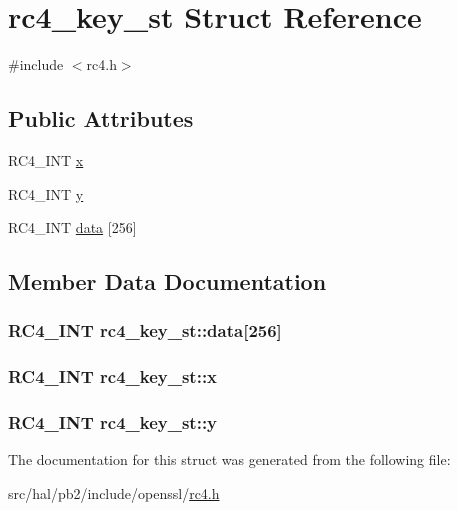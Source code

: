 \hypertarget{structrc4__key__st}{}\section{rc4\+\_\+key\+\_\+st Struct Reference}
\label{structrc4__key__st}


{\ttfamily \#include $<$rc4.\+h$>$}

\subsection*{Public Attributes}
\begin{DoxyCompactItemize}
\item 
R\+C4\+\_\+\+I\+NT \hyperlink{structrc4__key__st_a0d6aa0ac8fc40a7d1464aee47b5e776d}{x}
\item 
R\+C4\+\_\+\+I\+NT \hyperlink{structrc4__key__st_a9c19462d7de7a357d2922a3d94f89c0d}{y}
\item 
R\+C4\+\_\+\+I\+NT \hyperlink{structrc4__key__st_aed926f06ad89470f035e17200a12b659}{data} \mbox{[}256\mbox{]}
\end{DoxyCompactItemize}


\subsection{Member Data Documentation}
\subsubsection[{\texorpdfstring{data}{data}}]{\setlength{\rightskip}{0pt plus 5cm}R\+C4\+\_\+\+I\+NT rc4\+\_\+key\+\_\+st\+::data\mbox{[}256\mbox{]}}\hypertarget{structrc4__key__st_aed926f06ad89470f035e17200a12b659}{}\label{structrc4__key__st_aed926f06ad89470f035e17200a12b659}
\subsubsection[{\texorpdfstring{x}{x}}]{\setlength{\rightskip}{0pt plus 5cm}R\+C4\+\_\+\+I\+NT rc4\+\_\+key\+\_\+st\+::x}\hypertarget{structrc4__key__st_a0d6aa0ac8fc40a7d1464aee47b5e776d}{}\label{structrc4__key__st_a0d6aa0ac8fc40a7d1464aee47b5e776d}
\subsubsection[{\texorpdfstring{y}{y}}]{\setlength{\rightskip}{0pt plus 5cm}R\+C4\+\_\+\+I\+NT rc4\+\_\+key\+\_\+st\+::y}\hypertarget{structrc4__key__st_a9c19462d7de7a357d2922a3d94f89c0d}{}\label{structrc4__key__st_a9c19462d7de7a357d2922a3d94f89c0d}


The documentation for this struct was generated from the following file\+:\begin{DoxyCompactItemize}
\item 
src/hal/pb2/include/openssl/\hyperlink{rc4_8h}{rc4.\+h}\end{DoxyCompactItemize}

